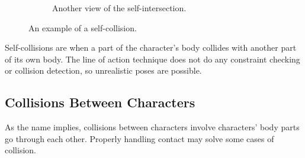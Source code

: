 \begin{figure}[h!]
\begin{subfigure}[b!]{0.45\textwidth}
                \label{fig:self1}
                \caption{Another view of the self-intersection.}
        \end{subfigure}%
        \caption{An example of a self-collision.}
	\label{fig:selfcollisions}
\end{figure}

Self-collisions are when a part of the character's body collides with another part of its own body. The line of action technique does not do any constraint checking or collision detection, so unrealistic poses are possible. 

\subsection{Collisions Between Characters}
As the name implies, collisions between characters involve characters' body parts go through each other. Properly handling contact may solve some cases of collision.

